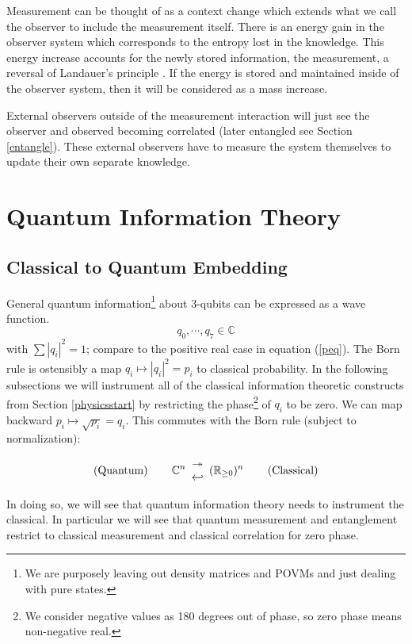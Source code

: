 \documentclass[12pt,a4paper]{article}
\theoremstyle{myrule}
\theoremstyle{postulate}
\theoremstyle{definition}
\begin{document}
Measurement can be thought of as a context change which extends what we call the observer to include the measurement itself.  There is an energy gain in the observer system which corresponds to the entropy lost in the knowledge.  This energy increase accounts for the newly stored information, the measurement, a reversal of Landauer's principle \cite{landauer}.  If the energy is stored and maintained inside of the observer system, then it will be considered as a mass increase.

External observers outside of the measurement interaction will just see the observer and observed becoming correlated (later entangled see Section \ref{entangle}).  These external observers have to measure the system themselves to update their own separate knowledge.

\section{Quantum Information Theory}
\subsection{Classical to Quantum Embedding}
\label{embed}
General quantum information\footnote{We are purposely leaving out density matrices and POVMs and just dealing with pure states.} about 3-qubits can be expressed as a wave function.
\[
   q_\mathit{0},\cdots,q_\mathit{7} \in \mathbb{C}
\]
with $\sum |q_i|^2 = 1$; compare to the positive real case in equation (\ref{peq}).  The Born rule is ostensibly a map $q_i \mapsto |q_i|^2 = p_i$ to classical probability.  In the following subsections we will instrument all of the classical information theoretic constructs from Section \ref{physicsstart} by restricting the phase\footnote{We consider negative values as 180 degrees out of phase, so zero phase means non-negative real.} of $q_i$ to be zero.  We can map backward $p_i \mapsto \sqrt{p_i} = q_i$.  This commutes with the Born rule (subject to normalization):

{
\renewcommand{\arraystretch}{0.1}
\[
\text{(Quantum)} \hspace{0.3 in}
\mathbb{C}^n \begin{array}{c} \twoheadrightarrow \\ \hookleftarrow \end{array}
(\mathbb{R}_{\ge 0})^n
\hspace{0.3 in} \text{(Classical)} 
\]
}

In doing so, we will see that quantum information theory needs to instrument the classical.  In particular we will see that quantum measurement and entanglement restrict to classical measurement and classical correlation for zero phase.
\end{document}
